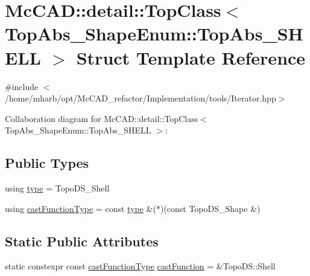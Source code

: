 \hypertarget{structMcCAD_1_1detail_1_1TopClass_3_01TopAbs__ShapeEnum_1_1TopAbs__SHELL_01_4}{}\section{Mc\+C\+AD\+:\+:detail\+:\+:Top\+Class$<$ Top\+Abs\+\_\+\+Shape\+Enum\+:\+:Top\+Abs\+\_\+\+S\+H\+E\+LL $>$ Struct Template Reference}
\label{structMcCAD_1_1detail_1_1TopClass_3_01TopAbs__ShapeEnum_1_1TopAbs__SHELL_01_4}


{\ttfamily \#include $<$/home/mharb/opt/\+Mc\+C\+A\+D\+\_\+refactor/\+Implementation/tools/\+Iterator.\+hpp$>$}



Collaboration diagram for Mc\+C\+AD\+:\+:detail\+:\+:Top\+Class$<$ Top\+Abs\+\_\+\+Shape\+Enum\+:\+:Top\+Abs\+\_\+\+S\+H\+E\+LL $>$\+:
\subsection*{Public Types}
\begin{DoxyCompactItemize}
\item 
using \hyperlink{structMcCAD_1_1detail_1_1TopClass_3_01TopAbs__ShapeEnum_1_1TopAbs__SHELL_01_4_ab3f5bb2954f60c3dbdd31ff79a77999a}{type} = Topo\+D\+S\+\_\+\+Shell
\item 
using \hyperlink{structMcCAD_1_1detail_1_1TopClass_3_01TopAbs__ShapeEnum_1_1TopAbs__SHELL_01_4_a320992f49b79075479043b38c34c27fb}{cast\+Function\+Type} = const \hyperlink{structMcCAD_1_1detail_1_1TopClass_3_01TopAbs__ShapeEnum_1_1TopAbs__SHELL_01_4_ab3f5bb2954f60c3dbdd31ff79a77999a}{type} \&($\ast$)(const Topo\+D\+S\+\_\+\+Shape \&)
\end{DoxyCompactItemize}
\subsection*{Static Public Attributes}
\begin{DoxyCompactItemize}
\item 
static constexpr const \hyperlink{structMcCAD_1_1detail_1_1TopClass_3_01TopAbs__ShapeEnum_1_1TopAbs__SHELL_01_4_a320992f49b79075479043b38c34c27fb}{cast\+Function\+Type} \hyperlink{structMcCAD_1_1detail_1_1TopClass_3_01TopAbs__ShapeEnum_1_1TopAbs__SHELL_01_4_a1abffa6cec324663d65c70c8640ebc9a}{cast\+Function} = \&Topo\+D\+S\+::\+Shell
\end{DoxyCompactItemize}


